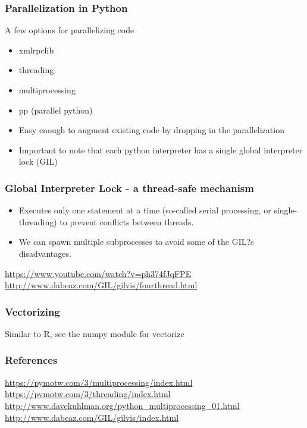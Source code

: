 \documentclass{beamer}
\begin{document}
\begin{frame}
\frametitle{Parallelization in Python}
\begin{block}{A few options for parallelizing code }
\begin{itemize}
\item xmlrpclib
\item threading
\item multiprocessing
\item pp (parallel python)
\end{itemize} 
\end{block} 

\begin{itemize}
\item Easy enough to augment existing code by dropping in the parallelization
\item Important to note that each python interpreter has a single global interpreter lock (GIL)
\end{itemize}  
\end{frame}




\begin{frame}
\frametitle{Global Interpreter Lock - a thread-safe mechanism}
\begin{itemize}
 

\item Executes only one statement at a time (so-called serial processing, or single-threading) to prevent conflicts between threads. 
\item We can spawn multiple subprocesses to avoid some of the GIL?s disadvantages.
\end{itemize}
\begin{figure}
\end{figure}
\url{https://www.youtube.com/watch?v=ph374fJqFPE}
\url{http://www.dabeaz.com/GIL/gilvis/fourthread.html}
\end{frame}
 


\begin{frame}
\frametitle{Vectorizing}
Similar to R, see the numpy module for vectorize
\end{frame}

\begin{frame}
\frametitle{References}
\url{https://pymotw.com/3/multiprocessing/index.html} %
\url{https://pymotw.com/3/threading/index.html} %
\url{http://www.davekuhlman.org/python_multiprocessing_01.html}
\url{http://www.dabeaz.com/GIL/gilvis/index.html}
\end{frame}


 
 
\end{document}
